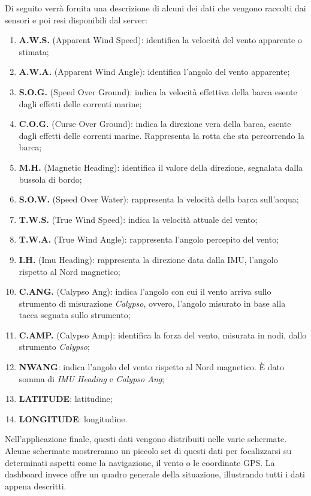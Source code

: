 Di seguito verrà fornita una descrizione di alcuni dei dati che vengono raccolti dai sensori e poi resi disponibili dal server:
\begin{enumerate}
	\item \textbf{A.W.S.} (Apparent Wind Speed): identifica la velocità del vento apparente o stimata;
	\item \textbf{A.W.A.} (Apparent Wind Angle): identifica l’angolo del vento apparente;
	\item \textbf{S.O.G.} (Speed Over Ground): indica la velocità effettiva della barca esente dagli effetti delle correnti marine;
	\item \textbf{C.O.G.} (Curse Over Ground): indica la direzione vera della barca, esente dagli effetti delle correnti marine. Rappresenta la rotta che sta percorrendo la barca;
	\item \textbf{M.H.} (Magnetic Heading): identifica il valore della direzione, segnalata dalla bussola di bordo;
	\item \textbf{S.O.W.} (Speed Over Water): rappresenta la velocità della barca sull’acqua;
	\item \textbf{T.W.S.} (True Wind Speed): indica la velocità attuale del vento;
	\item \textbf{T.W.A.} (True Wind Angle): rappresenta l'angolo percepito del vento;
	\item \textbf{I.H.} (Imu Heading): rappresenta la direzione data dalla IMU, l'angolo rispetto al Nord magnetico;
	\item \textbf{C.ANG.} (Calypso Ang): indica l'angolo con cui il vento arriva sullo strumento di misurazione \textit{Calypso}, ovvero, l’angolo misurato in base alla tacca segnata sullo strumento;
	\item \textbf{C.AMP.} (Calypso Amp): identifica la forza del vento, misurata in nodi, dallo strumento \textit{Calypso};
	\item \textbf{NWANG}: indica l'angolo del vento rispetto al Nord magnetico. È dato somma di \textit{IMU Heading} e \textit{Calypso Ang};
	\item \textbf{LATITUDE}:  latitudine;
	\item \textbf{LONGITUDE}: longitudine.
\end{enumerate}

Nell'applicazione finale, questi dati vengono distribuiti nelle varie schermate. Alcune schermate mostreranno un piccolo set di questi dati per focalizzarsi su determinati aspetti come la navigazione, il vento o le coordinate GPS. La dashboard invece offre un quadro generale della situazione, illustrando tutti i dati appena descritti.


